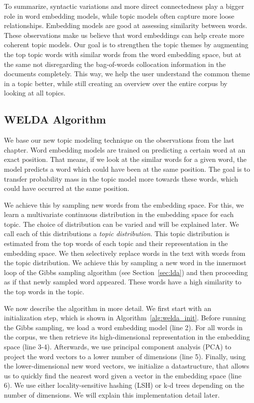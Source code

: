 \documentclass[
        a4paper,
        titlepage,
        twoside,
        parskip
        ]{scrbook}
\theoremstyle{break}
\begin{document}
To summarize, syntactic variations and more direct connectedness play a bigger role in word embedding models, while topic models often capture more loose relationships.
Embedding models are good at assessing similarity between words.
These observations make us believe that word embeddings can help create more coherent topic models.
Our goal is to strengthen the topic themes by augmenting the top topic words with similar words from the word embedding space, but at the same not disregarding the bag-of-words collocation information in the documents completely.
This way, we help the user understand the common theme in a topic better, while still creating an overview over the entire corpus by looking at all topics.

\subsection{WELDA Algorithm}

We base our new topic modeling technique on the observations from the last chapter.
Word embedding models are trained on predicting a certain word at an exact position.
That means, if we look at the similar words for a given word, the model predicts a word which could have been at the same position.
The goal is to transfer probability mass in the topic model more towards these words, which could have occurred at the same position.

We achieve this by sampling new words from the embedding space.
For this, we learn a multivariate continuous distribution in the embedding space for each topic.
The choice of distribution can be varied and will be explained later.
We call each of this distributions a \emph{topic distribution}.
This topic distribution is estimated from the top words of each topic and their representation in the embedding space.
We then selectively replace words in the text with words from the topic distribution.
We achieve this by sampling a new word in the innermost loop of the Gibbs sampling algorithm (see Section~\ref{sec:lda}) and then proceeding as if that newly sampled word appeared.
These words have a high similarity to the top words in the topic.

We now describe the algorithm in more detail.
We first start with an initialization step, which is shown in Algorithm~\ref{alg:welda_init}.
Before running the Gibbs sampling, we load a word embedding model (line 2).
For all words in the corpus, we then retrieve its high-dimensional representation in the embedding space (line 3-4).
Afterwards, we use principal component analysis (PCA) to project the word vectors to a lower number of dimensions (line 5).
Finally, using the lower-dimensional new word vectors, we initialize a datastructure, that allows us to quickly find the nearest word given a vector in the embedding space (line 6).
We use either locality-sensitive hashing (LSH) or k-d trees depending on the number of dimensions.
We will explain this implementation detail later.
\end{document}

